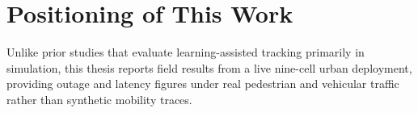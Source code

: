 \section{Positioning of This Work}
Unlike prior studies that evaluate learning-assisted tracking primarily in
simulation, this thesis reports field results from a live nine-cell urban
deployment, providing outage and latency figures under real pedestrian and
vehicular traffic rather than synthetic mobility traces.
